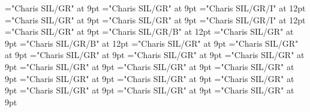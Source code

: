 \documentclass[gps1,twoside]{article}
\begin{document}
\font\spanspanlexsensereferencessensesensesentrybefore="Charis SIL/GR" at 9pt
\font\lexsensereferencessensesensesentryafter="Charis SIL/GR" at 9pt
\font\spanenownertypeabbreviationlexsensereferencelexsensereferencessensesensesentry="Charis SIL/GR/I" at 12pt
\font\spanspanownertypeabbreviationlexsensereferencelexsensereferencessensesensesentrybefore="Charis SIL/GR" at 9pt
\font\spanownertypeabbreviationlexsensereferencelexsensereferencessensesensesentrylastchildafter="Charis SIL/GR" at 9pt
\font\spanownertypeabbreviationlexsensereferencelexsensereferencessensesensesentry="Charis SIL/GR/I" at 12pt
\font\configtargetconfigtargetconfigtargetslexsensereferencelexsensereferencessensesensesentrybefore="Charis SIL/GR" at 9pt
\font\spanbzhheadwordconfigtargetconfigtargetslexsensereferencelexsensereferencessensesensesentry="Charis SIL/GR/B" at 12pt
\font\spanspanheadwordconfigtargetconfigtargetslexsensereferencelexsensereferencessensesensesentrybefore="Charis SIL/GR" at 9pt
\font\spanheadwordconfigtargetconfigtargetslexsensereferencelexsensereferencessensesensesentry="Charis SIL/GR/B" at 12pt
\font\variantformentrybackrefvariantformentrybackrefvariantformentrybackrefssensesensesentrybefore="Charis SIL/GR" at 9pt
\font\variantformentrybackrefssensesensesentrybefore="Charis SIL/GR" at 9pt
\font\variantformentrybackrefssensesensesentryafter="Charis SIL/GR" at 9pt
\font\variantentrytypevariantentrytypevariantentrytypesvariantformentrybackrefvariantformentrybackrefssensesensesentrybefore="Charis SIL/GR" at 9pt
\font\variantentrytypesvariantformentrybackrefvariantformentrybackrefssensesensesentryafter="Charis SIL/GR" at 9pt
\font\spanspanreverseabbrvariantentrytypevariantentrytypesvariantformentrybackrefvariantformentrybackrefssensesensesentrybefore="Charis SIL/GR" at 9pt
\font\spanreverseabbrvariantentrytypevariantentrytypesvariantformentrybackrefvariantformentrybackrefssensesensesentrylastchildafter="Charis SIL/GR" at 9pt
\font\spanspanheadwordvariantformentrybackrefvariantformentrybackrefssensesensesentrybefore="Charis SIL/GR" at 9pt
\font\spanspanowningentrysummarydefinitionvariantformentrybackrefvariantformentrybackrefssensesensesentrybefore="Charis SIL/GR" at 9pt
\font\spanowningentrysummarydefinitionvariantformentrybackrefvariantformentrybackrefssensesensesentrylastchildafter="Charis SIL/GR" at 9pt
\font\scientificnamesensesensesentryafter="Charis SIL/GR" at 9pt
\font\semanticdomainsemanticdomainsemanticdomainssensesensesentrybefore="Charis SIL/GR" at 9pt
\font\semanticdomainssensesensesentrybefore="Charis SIL/GR" at 9pt
\font\semanticdomainssensesensesentryafter="Charis SIL/GR" at 9pt
\end{document}
